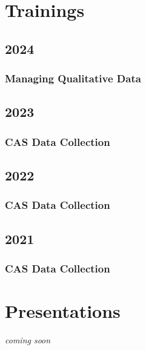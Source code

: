\documentclass[
  letterpaper,
  DIV=11,
  numbers=noendperiod]{scrreprt}
\begin{document}
\chapter*{Trainings}\label{trainings}


\section*{2024}\label{section}


\subsection*{Managing Qualitative Data}\label{managing-qualitative-data}

\section*{2023}\label{section-1}


\subsection*{CAS Data Collection}\label{cas-data-collection}

\section*{2022}\label{section-2}


\subsection*{CAS Data Collection}\label{cas-data-collection-1}

\section*{2021}\label{section-3}


\subsection*{CAS Data Collection}\label{cas-data-collection-2}

\chapter*{Presentations}\label{presentations}


\emph{coming soon}
\end{document}
